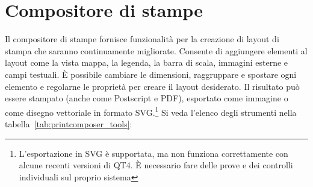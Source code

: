 
\section{Compositore di stampe}\label{label_printcomposer}


Il compositore di stampe fornisce funzionalità per la creazione di layout di
stampa che saranno continuamente migliorate. Consente di aggiungere elementi
al layout come la vista mappa, la legenda, la barra di scala, immagini esterne
e campi testuali. È possibile cambiare le dimensioni, raggruppare e spostare
ogni elemento e regolarne le proprietà per creare il layout desiderato. 
Il risultato può essere stampato (anche come Postscript e PDF), esportato come
immagine o come disegno vettoriale in formato SVG.\footnote{L'esportazione in
SVG è supportata, ma non funziona correttamente con alcune recenti versioni di
QT4. È necessario fare delle prove e dei controlli individuali sul proprio
sistema} Si veda l'elenco degli strumenti nella tabella~\ref{tab:printcomposer_tools}:

